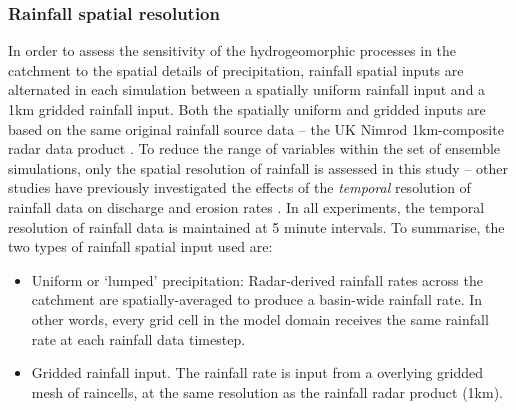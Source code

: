 \subsubsection{Rainfall spatial resolution}
In order to assess the sensitivity of the hydrogeomorphic processes in the catchment to the spatial details of precipitation, rainfall spatial inputs are alternated in each simulation between a spatially uniform rainfall input and a 1km gridded rainfall input. Both the spatially uniform and gridded inputs are based on the same original rainfall source data -- the UK Nimrod 1km-composite radar data product \citep{metoffice2003nimrod}. To reduce the range of variables within the set of ensemble simulations, only the spatial resolution of rainfall is assessed in this study -- other studies have previously investigated the effects of the \textit{temporal} resolution of rainfall data on discharge and erosion rates \citep{nicotina2008impact,Coulthard2013,coulthard2016sensitivity}. In all experiments, the temporal resolution of rainfall data is maintained at 5 minute intervals. To summarise, the two types of rainfall spatial input used are: 

\begin{itemize}
\item Uniform or `lumped' precipitation: Radar-derived rainfall rates across the catchment are spatially-averaged to produce a basin-wide rainfall rate. In other words, every grid cell in the model domain receives the same rainfall rate at each rainfall data timestep.
\item Gridded rainfall input. The rainfall rate is input from a overlying gridded mesh of raincells, at the same resolution as the rainfall radar product (1km).
\end{itemize}

